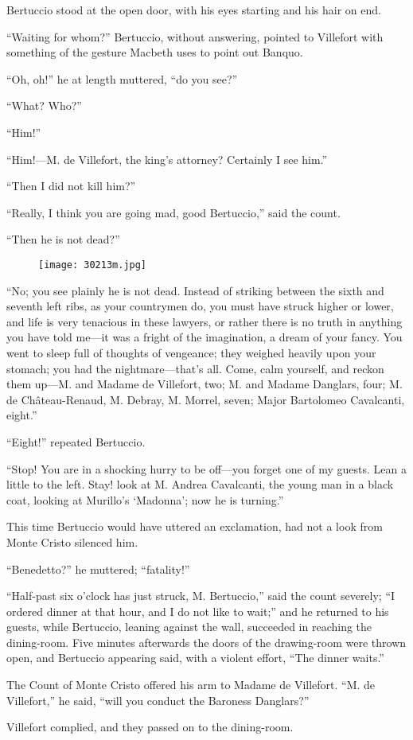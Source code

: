 Bertuccio stood at the open door, with his eyes starting and his hair
on end.

“Waiting for whom?” Bertuccio, without answering, pointed to Villefort
with something of the gesture Macbeth uses to point out Banquo.

“Oh, oh!” he at length muttered, “do you see?”

“What? Who?”

“Him!”

“Him!—M. de Villefort, the king’s attorney? Certainly I see him.”

“Then I did not kill him?”

“Really, I think you are going mad, good Bertuccio,” said the count.

“Then he is not dead?”

\begin{figure}[ht]
\texttt{[image: 30213m.jpg]}
\end{figure}

“No; you see plainly he is not dead. Instead of striking between the
sixth and seventh left ribs, as your countrymen do, you must have
struck higher or lower, and life is very tenacious in these lawyers, or
rather there is no truth in anything you have told me—it was a fright
of the imagination, a dream of your fancy. You went to sleep full of
thoughts of vengeance; they weighed heavily upon your stomach; you had
the nightmare—that’s all. Come, calm yourself, and reckon them up—M.
and Madame de Villefort, two; M. and Madame Danglars, four; M. de
Château-Renaud, M. Debray, M. Morrel, seven; Major Bartolomeo
Cavalcanti, eight.”

“Eight!” repeated Bertuccio.

“Stop! You are in a shocking hurry to be off—you forget one of my
guests. Lean a little to the left. Stay! look at M. Andrea Cavalcanti,
the young man in a black coat, looking at Murillo’s ‘Madonna’; now he
is turning.”

This time Bertuccio would have uttered an exclamation, had not a look
from Monte Cristo silenced him.

“Benedetto?” he muttered; “fatality!”

“Half-past six o’clock has just struck, M. Bertuccio,” said the count
severely; “I ordered dinner at that hour, and I do not like to wait;”
and he returned to his guests, while Bertuccio, leaning against the
wall, succeeded in reaching the dining-room. Five minutes afterwards
the doors of the drawing-room were thrown open, and Bertuccio appearing
said, with a violent effort, “The dinner waits.”

The Count of Monte Cristo offered his arm to Madame de Villefort. “M.
de Villefort,” he said, “will you conduct the Baroness Danglars?”

Villefort complied, and they passed on to the dining-room.

